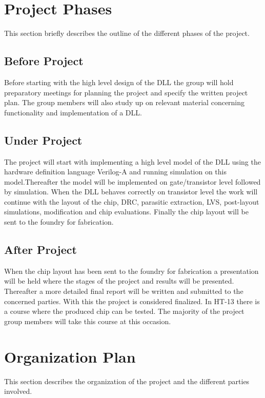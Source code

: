 \documentclass[a4paper,12pt]{article} \usepackage{graphicx}
\begin{document}
\section{Project Phases} 
This section briefly describes the outline of the different phases of the
project.
\subsection{Before Project}
Before starting with the high level design of the DLL the group will hold
preparatory meetings for planning the project and specify the written project
plan. The group members will also study up on relevant material concerning
functionality and implementation of a DLL.
  
\subsection{Under Project}
The project will start with implementing a high level model of the DLL using
the hardware definition language Verilog-A and running simulation on this
model.Thereafter the model will be implemented on gate/transistor level followed by
simulation. When the DLL behaves correctly on transistor level the work will
continue with the layout of the chip, DRC, parasitic extraction, LVS,
post-layout simulations, modification and chip evaluations. Finally the chip
layout will be sent to the foundry for fabrication.

\subsection{After Project}
When the chip layout has been sent to the foundry for fabrication a presentation
will be held where the stages of the project and results will be presented. 
Thereafter a more detailed final report will be written and submitted to the 
concerned parties. With this the project is considered finalized. In HT-13 there
is a course where the produced chip can be tested. The majority of the project
group members will take this course at this occasion.


\section{Organization Plan}
This section describes the organization of the project and the different
parties involved.
\end{document}
